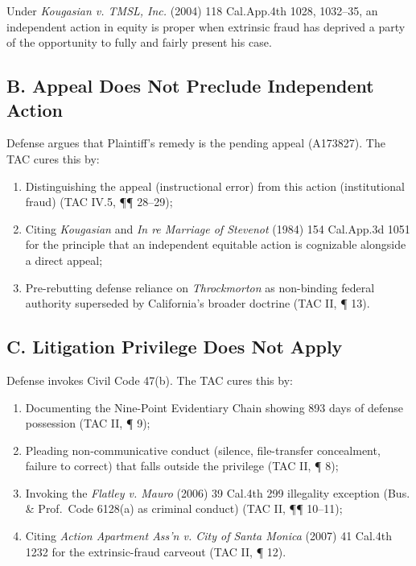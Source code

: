 Under \emph{Kougasian v. TMSL, Inc.} (2004) 118 Cal.App.4th 1028, 1032--35, an independent action in equity is proper when extrinsic fraud has deprived a party of the opportunity to fully and fairly present his case.

\subsection{B. Appeal Does Not Preclude Independent Action}\label{b.-appeal-does-not-preclude-independent-action}

Defense argues that Plaintiff's remedy is the pending appeal (A173827). The TAC cures this by:

\begin{enumerate}
\def\labelenumi{\arabic{enumi}.}
\tightlist
\item
  Distinguishing the appeal (instructional error) from this action (institutional fraud) (TAC \textsection{}IV.5, ¶¶ 28--29);
\item
  Citing \emph{Kougasian} and \emph{In re Marriage of Stevenot} (1984) 154 Cal.App.3d 1051 for the principle that an independent equitable action is cognizable alongside a direct appeal;
\item
  Pre-rebutting defense reliance on \emph{Throckmorton} as non-binding federal authority superseded by California's broader doctrine (TAC \textsection{}II, ¶ 13).
\end{enumerate}

\subsection{C. Litigation Privilege Does Not Apply}\label{c.-litigation-privilege-does-not-apply}

Defense invokes Civil Code \textsection{} 47(b). The TAC cures this by:

\begin{enumerate}
\def\labelenumi{\arabic{enumi}.}
\tightlist
\item
  Documenting the Nine-Point Evidentiary Chain showing 893 days of defense possession (TAC \textsection{}II, ¶ 9);
\item
  Pleading non-communicative conduct (silence, file-transfer concealment, failure to correct) that falls outside the privilege (TAC \textsection{}II, ¶ 8);
\item
  Invoking the \emph{Flatley v. Mauro} (2006) 39 Cal.4th 299 illegality exception (Bus. \& Prof.~Code \textsection{} 6128(a) as criminal conduct) (TAC \textsection{}II, ¶¶ 10--11);
\item
  Citing \emph{Action Apartment Ass'n v. City of Santa Monica} (2007) 41 Cal.4th 1232 for the extrinsic-fraud carveout (TAC \textsection{}II, ¶ 12).
\end{enumerate}

